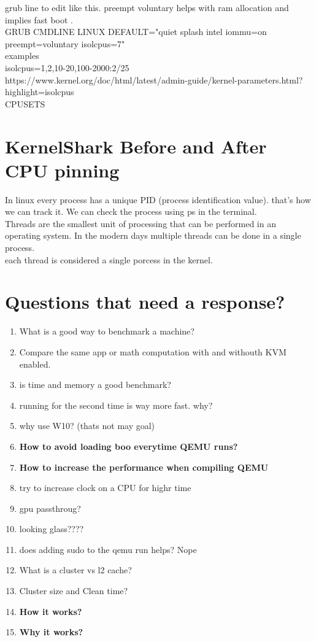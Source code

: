 \documentclass[11pt, a4paper, oneside]{article}
\theoremstyle{definition}
\begin{document}
grub line to edit like this. preempt voluntary helps with ram allocation and implies fast boot .\\
GRUB CMDLINE LINUX DEFAULT="quiet splash intel iommu=on preempt=voluntary isolcpus=7"\\

examples\\
isolcpus=1,2,10-20,100-2000:2/25\\

https://www.kernel.org/doc/html/latest/admin-guide/kernel-parameters.html?highlight=isolcpus\\

CPUSETS 

\vfill
\pagebreak
\section{KernelShark Before and After CPU pinning}

In linux every process has a unique PID (process identification value). that's how we can track it.
We can check the process using ps in the terminal.\\
Threads are the smallest unit of processing that can be performed in an operating system. In the modern days multiple threads can be done in a single process.\\
each thread is considered a single porcess in the kernel.\\



\vfill
\pagebreak
\section{Questions that need a response?}
\begin{enumerate}
	\item What is a good way to benchmark a machine?
	\item Compare the same app or math computation with and withouth KVM enabled.
	\item is time and memory a good benchmark?
	\item running for the second time is way more fast. why?
	\item why use W10? (thats not may goal)
	\item \textbf{How to avoid loading boo everytime QEMU runs?}
	\item \textbf{How to increase the performance when compiling QEMU}
	\item try to increase clock on a CPU for highr time
	\item gpu passthroug?
	\item looking glass????
	\item does adding sudo to the qemu run helps? Nope
	\item What is a cluster vs l2 cache?
	\item Cluster size and Clean time?
	\item \textbf{How it works?}
	\item \textbf{Why it works?}
\end{enumerate}
\end{document}
